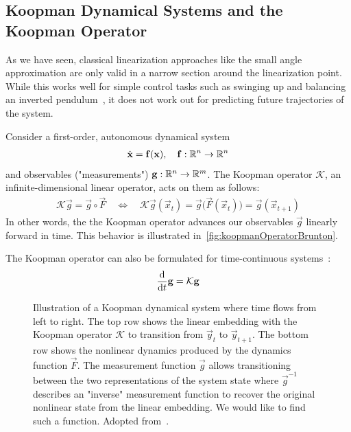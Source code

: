 		\subsection{Koopman Dynamical Systems and the Koopman Operator}
			As we have seen, classical linearization approaches like the small angle approximation are only valid in a narrow section around the linearization point. While this works well for simple control tasks such as swinging up and balancing an inverted pendulum~\cite{bugejaNonlinearSwingupStabilizing2003}, it does not work out for predicting future trajectories of the system. %

			Consider a first-order, autonomous dynamical system
			\begin{align*}
				\dot{\boldsymbol{\mathrm{x}}} = \boldsymbol{\mathrm{f}}(\boldsymbol{\mathrm{x}}),\quad \boldsymbol{\mathrm{f}} : \mathbb{R}^n \to \mathbb{R}^n
			\end{align*}
			and observables ("measurements") \( \boldsymbol{\mathrm{g}} : \mathbb{R}^n \to \mathbb{R}^m \). The Koopman operator \( \mathcal{K} \), an infinite-dimensional linear operator, acts on them as follows:
			\begin{align*}
				\mathcal{K} \vec{g} = \vec{g} \circ \vec{F} \quad\iff\quad \mathcal{K} \vec{g}(\vec{x}_t) = \vec{g}\big(\vec{F}(\vec{x}_t)\big) = \vec{g}(\vec{x}_{t + 1})
			\end{align*}
			In other words, the the Koopman operator advances our observables \(\vec{g}\) linearly forward in time. This behavior is illustrated in~\autoref{fig:koopmanOperatorBrunton}.

			The Koopman operator can also be formulated for time-continuous systems~\cite{abrahamManifoldsTensorAnalysis2012}:
			\begin{align*}
				\dv{t} \boldsymbol{\mathrm{g}} = \mathcal{K} \boldsymbol{\mathrm{g}}
			\end{align*}


			\begin{figure}
				\centering
				\tikzKoopmanOperator
				\caption{Illustration of a Koopman dynamical system where time flows from left to right. The top row shows the linear embedding with the Koopman operator \( \mathcal{K} \) to transition from \(\vec{y}_t\) to \(\vec{y}_{t + 1}\). The bottom row shows the nonlinear dynamics produced by the dynamics function \(\vec{F}\). The measurement function \(\vec{g}\) allows transitioning between the two representations of the system state where \(\vec{g}^{-1}\) describes an "inverse" measurement function to recover the original nonlinear state from the linear embedding. We would like to find such a function. Adopted from~\cite{bruntonKoopmanInvariantSubspaces2016}.}
				\label{fig:koopmanOperatorBrunton}
			\end{figure}

